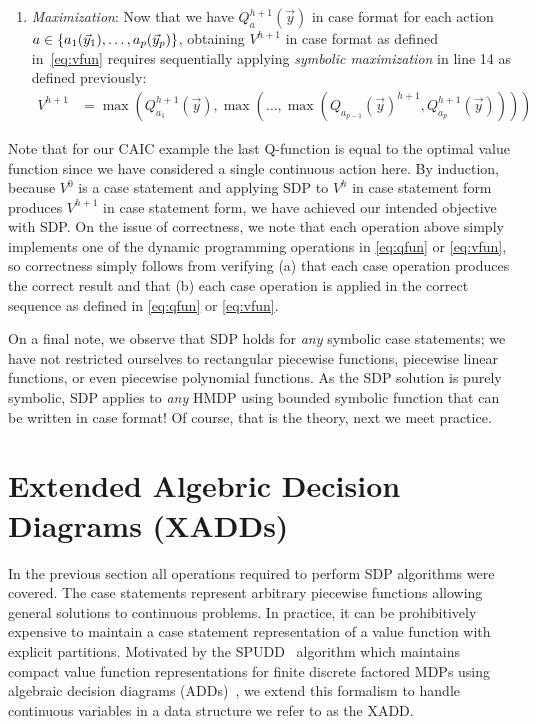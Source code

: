 \documentclass[twoside,11pt]{article}
\begin{document}
\begin{enumerate}
\item {\it Maximization}: Now that we have $Q_a^{h+1}(\vec{y})$ in
case format for each action $a \in\{a_{1}(\vec{y}_1), \ldots \\, a_{p}(\vec{y}_p)\}$, obtaining
$V^{h+1}$ in case format as defined in~\eqref{eq:vfun} requires
sequentially applying
\emph{symbolic maximization} in line 14 as defined previously:
\begin{align*}
V^{h+1} & = 
\max(Q_{a_1}^{h+1}(\vec{y}),\max(\ldots,\max(Q_{a_{p-1}}(\vec{y})^{h+1},Q_{a_p}^{h+1}(\vec{y}))))
\end{align*}
\end{enumerate}
Note that for our \textsc{CAIC} example the last Q-function is equal to the optimal value function since we have considered a single continuous action here. %
By induction, because $V^0$ is a case statement and applying
SDP to $V^h$ in case statement form produces $V^{h+1}$ in case
statement form, we have achieved our intended
objective with SDP.  On the issue of correctness,
we note that each operation above simply implements one of the
dynamic programming operations in \eqref{eq:qfun} or \eqref{eq:vfun}, 
so correctness simply follows from verifying (a) that each case
operation produces the correct result and that (b) each case operation
is applied in the correct sequence as defined in \eqref{eq:qfun} or 
\eqref{eq:vfun}.  

On a final note, we observe that SDP holds for \emph{any} symbolic
case statements; we have not restricted ourselves to rectangular
piecewise functions, piecewise linear functions, or even piecewise
polynomial functions.  As the SDP solution is purely symbolic,
SDP applies to \emph{any} HMDP using bounded symbolic function 
that can be written in case format!  Of course, that is the theory,
next we meet practice.

\section{Extended Algebric Decision Diagrams (XADDs)} \label{XADD}

In the previous section all operations required to perform SDP algorithms were covered. The case statements represent arbitrary piecewise functions allowing general solutions to continuous problems. In practice, it can be prohibitively expensive to maintain
a case statement representation of a value function with explicit
partitions.  Motivated by the SPUDD~\cite{spudd} algorithm which
maintains compact value function representations for finite discrete
factored MDPs using algebraic decision diagrams (ADDs)~\cite{bahar93add},
we extend this formalism to handle continuous variables in a data
structure we refer to as the XADD. 
\end{document}

